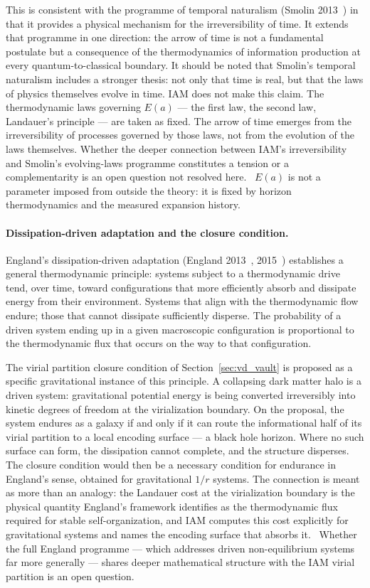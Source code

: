 This is consistent with the programme of temporal naturalism (Smolin 2013~\cite{Smolin2013}) in that it provides a physical mechanism for the
irreversibility of time. It extends that programme in one direction: the arrow of time is not a fundamental postulate but a consequence of the
thermodynamics of information production at every quantum-to-classical boundary. It should be noted that Smolin's temporal naturalism includes a stronger
thesis: not only that time is real, but that the laws of physics themselves evolve in time. IAM does not make this claim. The thermodynamic laws governing
$E(a)$ --- the first law, the second law, Landauer's principle --- are taken as fixed. The arrow of time emerges from the irreversibility of processes governed
by those laws, not from the evolution of the laws themselves. Whether the deeper connection between IAM's irreversibility and Smolin's evolving-laws
programme constitutes a tension or a complementarity is an open question not resolved here. \openprob\ $E(a)$ is not a parameter imposed from outside the
theory: it is fixed by horizon thermodynamics and the measured expansion history.

\paragraph{Dissipation-driven adaptation and the closure condition.} England's dissipation-driven adaptation (England 2013~\cite{England2013},
2015~\cite{England2015}) establishes a general thermodynamic principle: systems subject to a thermodynamic drive tend, over time, toward configurations that
more efficiently absorb and dissipate energy from their environment. Systems that align with the thermodynamic flow endure; those that cannot dissipate
sufficiently disperse. The probability of a driven system ending up in a given macroscopic configuration is proportional to the thermodynamic flux that
occurs on the way to that configuration.

The virial partition closure condition of Section~\ref{sec:vd_vault} is proposed as a specific gravitational instance of this principle. A collapsing dark
matter halo is a driven system: gravitational potential energy is being converted irreversibly into kinetic degrees of freedom at the virialization
boundary. On the proposal, the system endures as a galaxy if and only if it can route the informational half of its virial partition to a local encoding
surface --- a black hole horizon. Where no such surface can form, the dissipation cannot complete, and the structure disperses. The closure condition would
then be a necessary condition for endurance in England's sense, obtained for gravitational $1/r$ systems. The connection is meant as more than an analogy: the
Landauer cost at the virialization boundary is the physical quantity England's framework identifies as the thermodynamic flux required for stable
self-organization, and IAM computes this cost explicitly for gravitational systems and names the encoding surface that absorbs it. \conjecture\ Whether the full England programme ---
which addresses driven non-equilibrium systems far more generally --- shares deeper mathematical structure with the IAM virial partition is an open question.
\openprob

